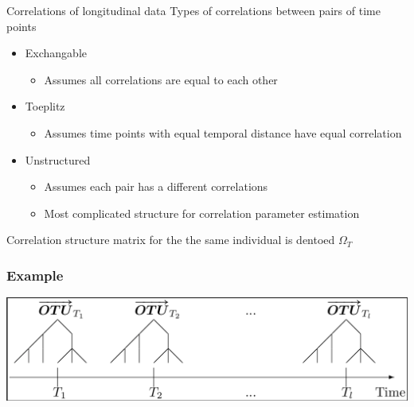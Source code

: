 \documentclass{beamer}
\begin{document}
\begin{frame}[t]{Correlations of longitudinal data }
  Types of correlations between pairs of time points
  \begin{itemize}
    \item Exchangable
    \begin{itemize}
      \item Assumes all correlations are equal to each other
    \end{itemize}
    \item Toeplitz
    \begin{itemize}
      \item Assumes time points with equal temporal distance have equal correlation
    \end{itemize}
    \item Unstructured
    \begin{itemize}
      \item Assumes each pair has a different correlations
      \item Most complicated structure for correlation parameter estimation
    \end{itemize}
  \end{itemize}
  Correlation structure matrix for the the same individual is dentoed $\Omega_T$
\end{frame}


\begin{frame}
\frametitle{Example}

\includegraphics[width = \textwidth]{otu_time_tree.png}

\end{frame}
\end{document}
